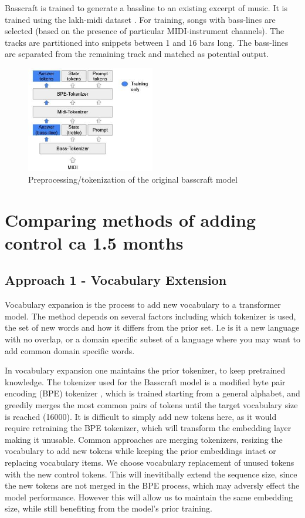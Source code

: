 Basscraft is trained to generate a bassline to an existing excerpt of music. It is trained using the lakh-midi dataset \cite{Raffel_2016}. For training, songs with bass-lines are selected (based on the presence of particular MIDI-instrument channels). The tracks are partitioned into snippets between 1 and 16 bars long. The bass-lines are separated from the remaining track and matched as potential output. 


\begin{figure}[H]
    \centering
    \includegraphics[width=0.5\textwidth]{IMAGES/Preprocessing1.jpg} 
    \caption{Preprocessing/tokenization of the original basscraft model}
    \label{fig:preprocessing1}
\end{figure}

\section{Comparing methods of adding control ca 1.5 months}
\subsection{Approach 1 - Vocabulary Extension}

Vocabulary expansion is the process to add new vocabulary to a transformer model. The method depends on several factors including which tokenizer is used, the set of new words and how it differs from the prior set. I.e is it a new language with no overlap, or a domain specific subset of a language where you may want to add common domain specific words.

In vocabulary expansion one maintains the prior tokenizer, to keep pretrained knowledge. 
The tokenizer used for the Basscraft model is a modified byte pair encoding (BPE) tokenizer \cite{Sennrich_Haddow_Birch_BPE_2016}, which is trained starting from a general alphabet, and greedily merges the most common pairs of tokens until the target vocabulary size is reached (16000). It is difficult to simply add new tokens here, as it would require retraining the BPE tokenizer, which will transform the embedding layer making it unusable. Common approaches are merging tokenizers, resizing the vocabulary to add new tokens while keeping the prior embeddings intact or replacing vocabulary items.
We choose vocabulary replacement of unused tokens with the new control tokens. This will inevitibally extend the sequence size, since the new tokens are not merged in the BPE process, which may adversly effect the model performance. However this will allow us to maintain the same embedding size, while still benefiting from the model's prior training. 

